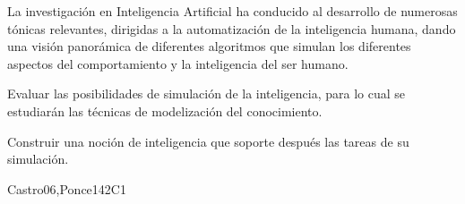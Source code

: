 \begin{syllabus}


\begin{justification}
La investigación en Inteligencia Artificial ha conducido al desarrollo de
numerosas tónicas relevantes, dirigidas a la automatización de la
inteligencia humana, dando una visión panorámica de diferentes
algoritmos que simulan los diferentes aspectos del comportamiento
y la inteligencia del ser humano.
\end{justification}

\begin{goals}
\item Evaluar las posibilidades de simulación de la inteligencia, para lo cual se estudiarán las técnicas de modelización del conocimiento.
\item Construir una noción de inteligencia que soporte después las tareas de su simulación.
\end{goals}

\begin{outcomes}
  \item {}
  \item {}
  \item {}
  \item {}
\end{outcomes}

\begin{competences}
    \item {} 
    \item {}
    \item {}
\end{competences}

\begin{unit}{\ISFundamentalIssues}{}{Castro06,Ponce14}{2}{C1}
\begin{topics}
    \item \ISFundamentalIssuesTopicOverview
    \item \ISFundamentalIssuesTopicWhat
    \item \ISFundamentalIssuesTopicProblem
    \item \ISFundamentalIssuesTopicNature
    \item \ISFundamentalIssuesTopicPhilosophical
\end{topics}
\begin{learningoutcomes}
    \item \ISFundamentalIssuesLODescribeTuring [\Usage]
    \item \ISFundamentalIssuesLODeterming [\Usage]
\end{learningoutcomes}
\end{unit}


\end{syllabus}
